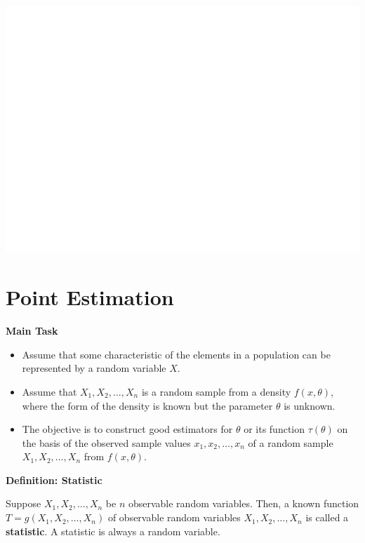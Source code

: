 \documentclass[]{book}
\providecommand{\tightlist}{%
  \setlength{\itemsep}{0pt}\setlength{\parskip}{0pt}}
\begin{document}
\begin{center}\includegraphics[width=1\linewidth]{figure/Ch2box1-1} \end{center}

\hypertarget{point-estimation}{%
\section{Point Estimation}\label{point-estimation}}

\textbf{Main Task}

\begin{itemize}
\tightlist
\item
  Assume that some characteristic of the elements in a population can be represented by a random variable \(X\).
\item
  Assume that \(X_1, X_2, \dots, X_n\) is a random sample from a density \(f(x, \theta)\), where the form of the density is known but the parameter \(\theta\) is unknown.
\item
  The objective is to construct good estimators for \(\theta\) or its function \(\tau (\theta)\) on the basis of the observed sample values \(x_1, x_2, \dots, x_n\) of a random sample \(X_1, X_2, \dots, X_n\) from \(f(x, \theta)\).
\end{itemize}

\textbf{Definition: Statistic}

Suppose \(X_1, X_2, \dots, X_n\) be \(n\) observable random variables. Then, a known function \(T=g(X_1, X_2, \dots, X_n)\) of observable random variables \(X_1, X_2, \dots, X_n\) is called a \textbf{statistic}. A statistic is always a random variable.
\end{document}
